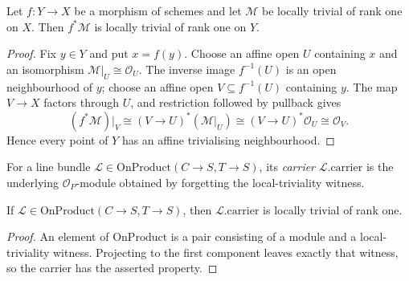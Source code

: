\begin{lemma}\leanok
  \label{lem:IsLocallyTrivial_pullback}
  Let $f:Y\to X$ be a morphism of schemes and let $\mathcal M$ be locally
  trivial of rank one on $X$.  Then $f^*\mathcal M$ is locally trivial of rank
  one on $Y$.
\end{lemma}
\begin{proof}
  \leanok
  Fix $y\in Y$ and put $x=f(y)$.  Choose an affine open $U$ containing $x$
  and an isomorphism $\mathcal M|_U\cong\mathcal O_U$.  The inverse image
  $f^{-1}(U)$ is an open neighbourhood of $y$; choose an affine open
  $V\subseteq f^{-1}(U)$ containing $y$.  The map $V\to X$ factors through
  $U$, and restriction followed by pullback gives
  \[
    (f^*\mathcal M)|_V
      \cong (V\to U)^*(\mathcal M|_U)
      \cong (V\to U)^*\mathcal O_U
      \cong \mathcal O_V.
  \]
  Hence every point of $Y$ has an affine trivialising neighbourhood.
\end{proof}
\begin{definition}\leanok
  \label{def:OnProduct_carrier}
  For a line bundle $\mathcal L\in\mathrm{OnProduct}(C\to S,T\to S)$, its
  \emph{carrier} $\mathcal L.\mathrm{carrier}$ is the underlying
  $\mathcal O_P$-module obtained by forgetting the local-triviality witness.
\end{definition}

\begin{lemma}\leanok
  \label{lem:OnProduct_isLocallyTrivial}
  If $\mathcal L\in\mathrm{OnProduct}(C\to S,T\to S)$, then
  $\mathcal L.\mathrm{carrier}$ is locally trivial of rank one.
\end{lemma}
\begin{proof}
  \leanok
  An element of $\mathrm{OnProduct}$ is a pair consisting of a module and a
  local-triviality witness.  Projecting to the first component leaves exactly
  that witness, so the carrier has the asserted property.
\end{proof}

